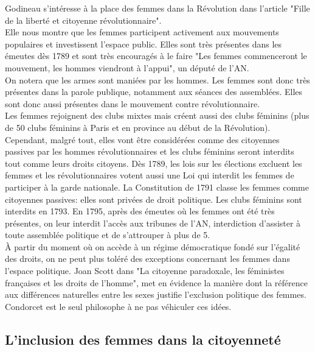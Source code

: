 \documentclass[10pt, a4paper, openany]{book}
\begin{document}
Godineau s'intéresse à la place des femmes dans la Révolution dans l'article "Fille de la liberté et citoyenne révolutionnaire". \\
Elle nous montre que les femmes participent activement aux mouvements populaires et investissent l'espace public. Elles sont très présentes dans les émeutes dès 1789 et sont très encouragés à le faire "Les femmes commenceront le mouvement, les hommes viendront à l'appui", un député de l'AN. \\
On notera que les armes sont maniées par les hommes. Les femmes sont donc très présentes dans la parole publique, notamment aux séances des assemblées. Elles sont donc aussi présentes dans le mouvement contre révolutionnaire. \\
Les femmes rejoignent des clubs mixtes mais créent aussi des clubs féminins (plus de 50 clubs féminins à Paris et en province au début de la Révolution). \\
Cependant, malgré tout, elles vont être considérées comme des citoyennes passives par les hommes révolutionnaires et les clubs féminins seront interdits tout comme leurs droits citoyens. Dès 1789, les lois sur les élections excluent les femmes et les révolutionnaires votent aussi une Loi qui interdit les femmes de participer à la garde nationale. La Constitution de 1791 classe les femmes comme citoyennes passives: elles sont privées de droit politique. Les clubs féminins sont interdits en 1793. En 1795, après des émeutes où les femmes ont été très présentes, on leur interdit l'accès aux tribunes de l'AN, interdiction d'assister à toute assemblée politique et de s'attrouper à plus de 5. \\
À partir du moment où on accède à un régime démocratique fondé sur l'égalité des droits, on ne peut plus toléré des exceptions concernant les femmes dans l'espace politique. Joan Scott dans "La citoyenne paradoxale, les féministes françaises et les droits de l'homme", met en évidence la manière dont la référence aux différences naturelles entre les sexes justifie l'exclusion politique des femmes. \\
Condorcet est le seul philosophe à ne pas véhiculer ces idées. 


\subsection{L'inclusion des femmes dans la citoyenneté}
\end{document}

